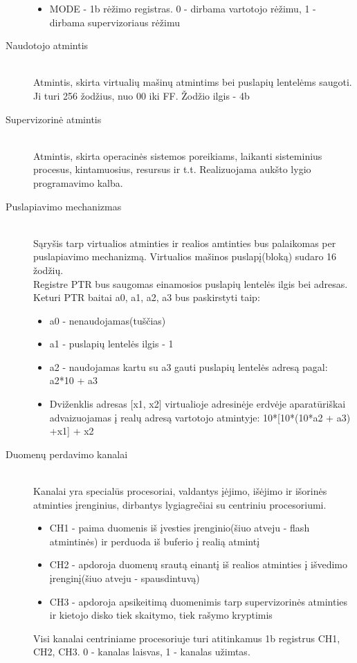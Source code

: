 \begin{description}
\begin{itemize}
  \item MODE - 1b rėžimo registras. 0 - dirbama vartotojo rėžimu, 1 - dirbama supervizoriaus rėžimu
\end{itemize}

  \item[Naudotojo atmintis] \leavevmode \\
Atmintis, skirta virtualių mašinų atmintims bei puslapių lentelėms saugoti. Ji turi 256 žodžius, nuo 00 iki FF. Žodžio ilgis - 4b
  \item[Supervizorinė atmintis] \leavevmode \\
Atmintis, skirta operacinės sistemos poreikiams, laikanti sisteminius procesus, kintamuosius, resursus ir t.t. Realizuojama aukšto lygio programavimo kalba.

\item[Puslapiavimo mechanizmas] \leavevmode \\
Sąryšis tarp virtualios atminties ir realios amtinties bus palaikomas per puslapiavimo mechanizmą. Virtualios mašinos puslapį(bloką) sudaro 16 žodžių.
\\ Registre PTR bus saugomas einamosios puslapių lentelės ilgis bei adresas. Keturi PTR baitai a0, a1, a2, a3 bus paskirstyti taip:
\begin{itemize}
\item a0 - nenaudojamas(tuščias)
\item a1 - puslapių lentelės ilgis - 1
\item a2 - naudojamas kartu su a3 gauti puslapių lentelės adresą pagal: a2*10 + a3
\item Dviženklis adresas [x1, x2]  virtualioje adresinėje erdvėje aparatūriškai advaizuojamas į realų adresą vartotojo atmintyje: 10*[10*(10*a2 + a3) +x1] + x2
\end{itemize}

  \item[Duomenų perdavimo kanalai] \leavevmode \\
Kanalai yra specialūs procesoriai, valdantys įėjimo, išėjimo ir išorinės atminties įrenginius, dirbantys lygiagrečiai su centriniu procesoriumi.
\begin{itemize}
  \item CH1 - paima duomenis iš įvesties įrenginio(šiuo atveju - flash atmintinės) ir perduoda iš buferio į realią atmintį
  \item CH2 - apdoroja duomenų srautą einantį iš realios atminties į išvedimo įrenginį(šiuo atveju - spausdintuvą)
  \item CH3 - apdoroja apsikeitimą duomenimis tarp supervizorinės atminties ir kietojo disko tiek skaitymo, tiek rašymo kryptimis
\end{itemize}
Visi kanalai centriniame procesoriuje turi atitinkamus 1b registrus CH1, CH2, CH3. 0 - kanalas laisvas, 1 - kanalas užimtas.


\end{description}
